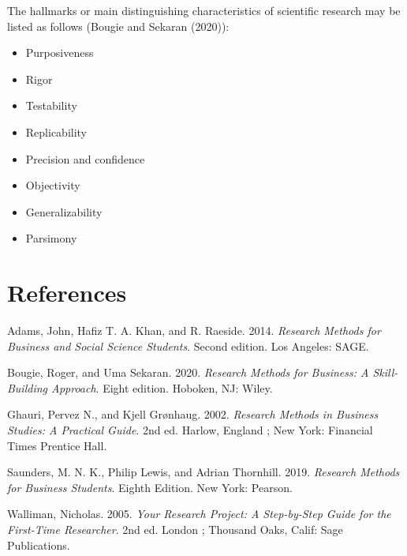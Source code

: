 \documentclass[
  letterpaper,
  DIV=11,
  numbers=noendperiod]{scrreprt}
\providecommand{\tightlist}{%
  \setlength{\itemsep}{0pt}\setlength{\parskip}{0pt}}\usepackage{longtable,booktabs,array}
\newlength{\cslhangindent}
\newenvironment{CSLReferences}[2] %
 {\begin{list}{}{%
  \setlength{\itemindent}{0pt}
  \setlength{\leftmargin}{0pt}
  \setlength{\parsep}{0pt}
  \ifodd #1
   \setlength{\leftmargin}{\cslhangindent}
   \setlength{\itemindent}{-1\cslhangindent}
  \fi
  \setlength{\itemsep}{#2\baselineskip}}}
 {\end{list}}
\begin{document}
The hallmarks or main distinguishing characteristics of scientific
research may be listed as follows (Bougie and Sekaran (2020)):

\begin{itemize}
\tightlist
\item
  Purposiveness
\item
  Rigor
\item
  Testability
\item
  Replicability
\item
  Precision and confidence
\item
  Objectivity
\item
  Generalizability
\item
  Parsimony
\end{itemize}


\chapter*{References}\label{references}


\label{refs}
\begin{CSLReferences}{1}{0}
Adams, John, Hafiz T. A. Khan, and R. Raeside. 2014. \emph{Research
Methods for Business and Social Science Students}. Second edition. Los
Angeles: SAGE.

Bougie, Roger, and Uma Sekaran. 2020. \emph{Research Methods for
Business: A Skill-Building Approach}. Eight edition. Hoboken, NJ: Wiley.

Ghauri, Pervez N., and Kjell Grønhaug. 2002. \emph{Research Methods in
Business Studies: A Practical Guide}. 2nd ed. Harlow, England ; New
York: Financial Times Prentice Hall.

Saunders, M. N. K., Philip Lewis, and Adrian Thornhill. 2019.
\emph{Research Methods for Business Students}. Eighth Edition. New York:
Pearson.

Walliman, Nicholas. 2005. \emph{Your Research Project: A Step-by-Step
Guide for the First-Time Researcher}. 2nd ed. London ; Thousand Oaks,
Calif: Sage Publications.

\end{CSLReferences}
\end{document}

